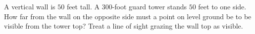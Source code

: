 A vertical wall is $50$ feet tall. A $300$-foot guard tower stands $50$ feet to one side. How far from the wall on the opposite side must a point on level ground be to be visible from the tower top? Treat a line of sight grazing the wall top as visible.
